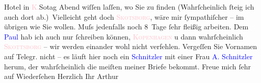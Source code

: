                Hotel in \textcolor{pink}{K.}{}\ledrightnote{\textcolor{pink}{Kopenhagen}}{ }So{\geminationn}tag Abend wiſſen laſſen, wo Sie zu
               finden (Wahrſcheinlich ſteig ich {\pb}auch dort
               ab.) Vielleicht geht doch \textcolor{pink}{\textsc{Skotsborg}}{}\ledrightnote{\textcolor{pink}{Skodsborg}}, wäre mir ſympathiſcher – im übrigen wie Sie wollen. Muſs jedenfalls noch
               8 Tage ſehr fleißig arbeiten. Dem \textcolor{blue}{Paul}{}\ledrightnote{\textcolor{blue}{Paul Goldmann}} hab
               ich auch nur ſchreiben können, \textcolor{pink}{\textsc{Kopenhagen}}{}\ledrightnote{\textcolor{pink}{Kopenhagen}} u dann wahrſcheinlich \textcolor{pink}{\textsc{Skottsborg}}{}\ledrightnote{\textcolor{pink}{Skodsborg}} – wir werden einander wohl nicht verfehlen. Vergeſſen Sie Vornamen auf Telegr.
               nicht – es läuft hier noch ein \textcolor{blue}{Schnitzler}{}\ledrightnote{\textcolor{blue}{Schnitzler}} mit
               einer Frau \textcolor{blue}{A. Schnitzler}{}\ledrightnote{\textcolor{blue}{A. Schnitzler}} herum, der
               wahrſcheinlich die meiſten meiner Briefe bekommt. Freue mich ſehr auf Wiederſehen\pend
           \pstart Herzlich Ihr \spacefill\mbox{Arthur}\pend{}\endnumbering{}  
      